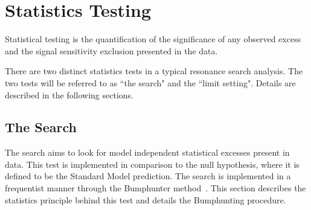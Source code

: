 \section{Statistics Testing}
\label{section:stats}
Statistical testing is the quantification of the significance of any observed excess and the signal sensitivity exclusion presented in the data. 


%
%
%
There are two distinct statistics tests in a typical resonance search analysis. The two tests will be referred to as ``the search" and the ``limit setting". Details are described in the following sections.





\subsection{The Search}
\label{sec:thesearch}

The search aims to look for model independent statistical excesses present in data. This test is implemented in comparison to the null hypothesis, where it is defined to be the Standard Model prediction. The search is implemented in a frequentist manner through the Bumphunter method~\cite{choudalakis2011hypothesis}. This section describes the statistics principle behind this test and details the Bumphunting procedure. 

